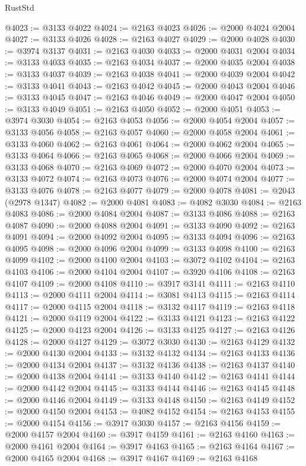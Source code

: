 \begin{lexlean}{RustStd}
\begin{coremodule}
@4023 := @3133 @4022
@4024 := @2163 @4023
@4026 := @2000 @4024 @2004
@4027 := @3133 @4026
@4028 := @2163 @4027
@4029 := @2000 @4028
@4030 := @3974 @3137
@4031 := @2163 @4030
@4033 := @2000 @4031 @2004
@4034 := @3133 @4033
@4035 := @2163 @4034
@4037 := @2000 @4035 @2004
@4038 := @3133 @4037
@4039 := @2163 @4038
@4041 := @2000 @4039 @2004
@4042 := @3133 @4041
@4043 := @2163 @4042
@4045 := @2000 @4043 @2004
@4046 := @3133 @4045
@4047 := @2163 @4046
@4049 := @2000 @4047 @2004
@4050 := @3133 @4049
@4051 := @2163 @4050
@4052 := @2000 @4051
@4053 := @3974 @3030
@4054 := @2163 @4053
@4056 := @2000 @4054 @2004
@4057 := @3133 @4056
@4058 := @2163 @4057
@4060 := @2000 @4058 @2004
@4061 := @3133 @4060
@4062 := @2163 @4061
@4064 := @2000 @4062 @2004
@4065 := @3133 @4064
@4066 := @2163 @4065
@4068 := @2000 @4066 @2004
@4069 := @3133 @4068
@4070 := @2163 @4069
@4072 := @2000 @4070 @2004
@4073 := @3133 @4072
@4074 := @2163 @4073
@4076 := @2000 @4074 @2004
@4077 := @3133 @4076
@4078 := @2163 @4077
@4079 := @2000 @4078
@4081 := @2043 (@2978 @1347)
@4082 := @2000 @4081
@4083 := @4082 @3030
@4084 := @2163 @4083
@4086 := @2000 @4084 @2004
@4087 := @3133 @4086
@4088 := @2163 @4087
@4090 := @2000 @4088 @2004
@4091 := @3133 @4090
@4092 := @2163 @4091
@4094 := @2000 @4092 @2004
@4095 := @3133 @4094
@4096 := @2163 @4095
@4098 := @2000 @4096 @2004
@4099 := @3133 @4098
@4100 := @2163 @4099
@4102 := @2000 @4100 @2004
@4103 := @3072 @4102
@4104 := @2163 @4103
@4106 := @2000 @4104 @2004
@4107 := @3920 @4106
@4108 := @2163 @4107
@4109 := @2000 @4108
@4110 := @3917 @3141
@4111 := @2163 @4110
@4113 := @2000 @4111 @2004
@4114 := @3081 @4113
@4115 := @2163 @4114
@4117 := @2000 @4115 @2004
@4118 := @3132 @4117
@4119 := @2163 @4118
@4121 := @2000 @4119 @2004
@4122 := @3133 @4121
@4123 := @2163 @4122
@4125 := @2000 @4123 @2004
@4126 := @3133 @4125
@4127 := @2163 @4126
@4128 := @2000 @4127
@4129 := @3072 @3030
@4130 := @2163 @4129
@4132 := @2000 @4130 @2004
@4133 := @3132 @4132
@4134 := @2163 @4133
@4136 := @2000 @4134 @2004
@4137 := @3132 @4136
@4138 := @2163 @4137
@4140 := @2000 @4138 @2004
@4141 := @3133 @4140
@4142 := @2163 @4141
@4144 := @2000 @4142 @2004
@4145 := @3133 @4144
@4146 := @2163 @4145
@4148 := @2000 @4146 @2004
@4149 := @3133 @4148
@4150 := @2163 @4149
@4152 := @2000 @4150 @2004
@4153 := @4082 @4152
@4154 := @2163 @4153
@4155 := @2000 @4154
@4156 := @3917 @3030
@4157 := @2163 @4156
@4159 := @2000 @4157 @2004
@4160 := @3917 @4159
@4161 := @2163 @4160
@4163 := @2000 @4161 @2004
@4164 := @3917 @4163
@4165 := @2163 @4164
@4167 := @2000 @4165 @2004
@4168 := @3917 @4167
@4169 := @2163 @4168

\end{coremodule}
\end{lexlean}
